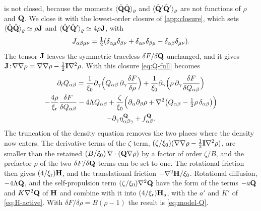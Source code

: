 \documentclass[aps,pre,reprint,superscriptaddress,longbibliography,nofootinbib
]{revtex4-2}
\begin{document}
 is not closed, because the moments
$\langle\hat{\mathbf{Q}}\hat{\mathbf{Q}}\rangle_\varrho$ and
$\langle\hat{\mathbf{Q}}'\hat{\mathbf{Q}}'\rangle_\varrho$ are not functions of
$\rho$ and $\mathbf{Q}$. We close it with the lowest-order closure
of \cref{app:closure}, which sets
$\langle\hat{\mathbf{Q}}\hat{\mathbf{Q}}\rangle_\varrho\simeq\rho\mathbf{J}$ and
$\langle\hat{\mathbf{Q}}'\hat{\mathbf{Q}}'\rangle_\varrho\simeq4\rho\mathbf{J}$, with
\begin{equation}
  \label{eq:J-definition}
  J_{\alpha\beta\mu\nu}=\tfrac12(\delta_{\alpha\mu}\delta_{\beta\nu}+\delta_{\alpha\nu}\delta_{\beta\mu}
  -\delta_{\alpha\beta}\delta_{\mu\nu}).
\end{equation}
The tensor $\mathbf{J}$ leaves the symmetric traceless $\delta
F/\delta\mathbf{Q}$ unchanged, and it gives
$\mathbf{J}\!:\!\nabla\nabla\rho
=\nabla\nabla\rho-\tfrac12\mathbf{I}\nabla^2\rho$. With this
closure \cref{eq:Q-full} becomes
\begin{multline}
  \label{eq:Q-closed}
  \partial_t Q_{\alpha\beta} =
  \frac{1}{\xi_0}\partial_\gamma\Bigl(Q_{\alpha\beta}\,\partial_\gamma\frac{\delta F}{\delta\rho}\Bigr)
  +\frac{1}{\xi_0}\partial_\gamma\Bigl(\rho\,\partial_\gamma\frac{\delta F}{\delta Q_{\alpha\beta}}\Bigr)
  \\
  -\frac{4\rho}{\xi_{\rm r}}\frac{\delta F}{\delta Q_{\alpha\beta}} -4\Lambda Q_{\alpha\beta}
  +\frac{\zeta}{\xi_0}\Bigl(\partial_\alpha\partial_\beta\rho
  +\nabla^2\bigl(Q_{\alpha\beta}-\tfrac12\rho\,\delta_{\alpha\beta}\bigr)\Bigr)
  \\
  - \partial_\gamma\eta^{\mathbf{Q}}_{{\alpha\beta}\gamma}+ f^{\mathbf{Q}}_{\alpha\beta} .
\end{multline}
The truncation of the density equation removes the two
places where the density now enters. The derivative terms
of the $\zeta$ term,
$(\zeta/\xi_0)(\nabla\nabla\rho-\tfrac12\mathbf{I}\nabla^2\rho)$,
are smaller than the retained $(B/\xi_0)\,\nabla\cdot(\mathbf{Q}
\nabla\rho)$ by a factor of order $\zeta/B$, and the
prefactor $\rho$ of the two $\delta F/\delta\mathbf{Q}$ terms can
be set to one. The rotational friction then gives
$(4/\xi_{\rm r})\mathbf{H}$, and the translational friction
$-\nabla^2\mathbf{H}/\xi_0$. Rotational diffusion, $-4\Lambda\mathbf{Q}$,
and the self-propulsion term $(\zeta/\xi_0)\nabla^2\mathbf{Q}$ have
the form of the terms $-a\mathbf{Q}$ and $K\nabla^2\mathbf{Q}$ of $\mathbf{H}$ and
combine with it into $(4/\xi_{\rm r})\mathbf{H}_\text{a}$, with the $a'$ and $K'$
of \cref{eq:H-active}. With $\delta F/\delta\rho=B(\rho-1)$
the result is \cref{eq:model-Q}.
\end{document}

